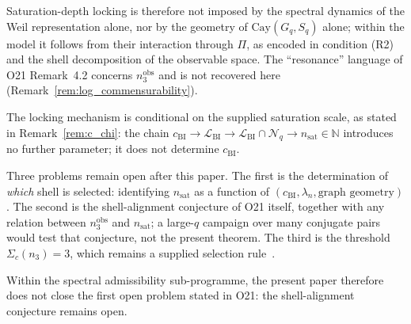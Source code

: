 \documentclass[12pt,a4paper]{article}
\theoremstyle{remark}
\newcommand{\cchi}{c_{\mathrm{BI}}}
\newcommand{\nsat}{n_{\mathrm{sat}}}
\newcommand{\nobs}{n^{\mathrm{obs}}_3}
\newcommand{\Cay}{\mathrm{Cay}(G_q, S_q)}
\begin{document}
  Saturation-depth locking is therefore not imposed by the spectral dynamics of the Weil
  representation alone, nor by the geometry of $\Cay$ alone; within the model it follows
  from their interaction through $\Pi$, as encoded in condition (R2) and the shell
  decomposition of the observable space.
  The ``resonance'' language of O21 Remark~4.2 concerns $\nobs$ and is not recovered
  here (Remark~\ref{rem:log_commensurability}).

  The locking mechanism is conditional on the supplied saturation scale, as stated in
  Remark~\ref{rem:c_chi}: the chain
  $\cchi \to \mathcal{L}_{\mathrm{BI}} \to \mathcal{L}_{\mathrm{BI}} \cap \mathcal{N}_q
  \to \nsat \in \mathbb{N}$
  introduces no further parameter; it does not determine $\cchi$.

  Three problems remain open after this paper.
  The first is the determination of \emph{which} shell is selected: identifying
  $\nsat$ as a function of $(\cchi, \lambda_n, \text{graph geometry})$.
  The second is the shell-alignment conjecture of O21 itself, together with any
  relation between $\nobs$ and $\nsat$; a large-$q$ campaign over many conjugate pairs
  would test that conjecture, not the present theorem.
  The third is the threshold $\Sigma_c(n_3) = 3$, which remains a supplied selection
  rule~\cite{Beau2026a28}.

  Within the spectral admissibility sub-programme, the present paper therefore does not
  close the first open problem stated in O21: the shell-alignment conjecture remains
  open.

  
      
\end{document}
